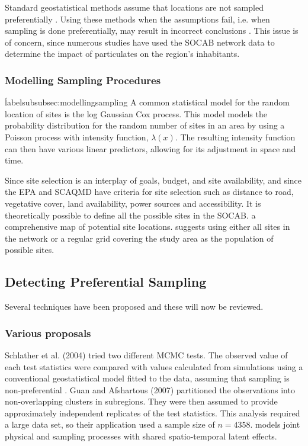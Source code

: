 \documentclass{article}
\begin{document}
Standard geostatistical methods assume that locations are not sampled preferentially \citep{diggle2010geostatistical}.  Using these methods when the assumptions fail, i.e. when sampling is done preferentially, may result in incorrect conclusions \citep{isaaks1988spatial}.  This issue is of concern, since numerous studies have used the \ac{SOCAB} network data to determine the impact of particulates on the region's inhabitants.

\subsubsection*{Modelling Sampling Procedures}
\'label{subsubsec:modellingsampling}
A common statistical model for the random location of sites is the log Gaussian Cox process.  This model models the probability distribution for the random number of sites in an area by using a Poisson process with intensity function, $\lambda(x)$.  
The resulting intensity function can then have various linear predictors, allowing for its adjustment in space and time.

Since site selection is an interplay of goals, budget, and site availability, and since the \ac{EPA} and \ac{SCAQMD} have criteria for site selection such as distance to road, vegetative cover, land availability, power sources and accessibility.  It is theoretically possible to define all the possible sites in the \ac{SOCAB}.  
 a comprehensive map of potential site locations.  
\citet{watson2019} suggests using either all sites in the network or a regular grid covering the study area as the population of possible sites.  


\subsection{Detecting Preferential Sampling}
\label{subsec:prefsampdetection}
Several techniques have been proposed and these will now be reviewed.

\subsubsection*{Various proposals}
\label{subsubsec:various}
Schlather et al. (2004) tried two different MCMC tests.  The observed value of each test statistics were compared with values calculated from simulations using a conventional geostatistical model fitted to the data,  assuming that sampling is non-preferential \citep{schlather2004detecting}.  Guan and Afshartous (2007) partitioned the observations into non-overlapping clusters in subregions. They were then assumed to provide approximately independent replicates of the test statistics. This analysis required a large data set, so  their application used a sample size of 
$ n = 4358 $.  
\cite{diggle10} models  joint physical and sampling processes with shared spatio-temporal latent effects.
\end{document}
